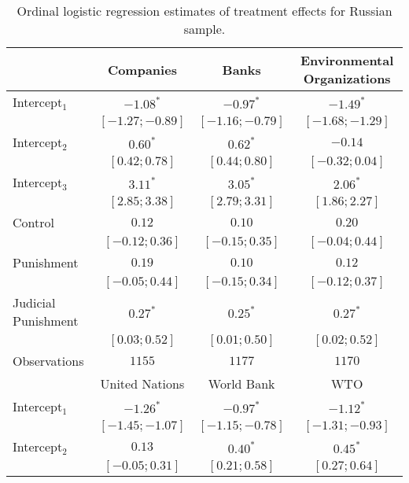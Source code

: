 \begin{table}[h]
\begin{center}
\caption{Ordinal logistic regression estimates of treatment effects for Russian sample.}
\begin{threeparttable}
\begin{tabular}{l c c c}
\hline
 & Companies & Banks & Environmental
Organizations \\
\hline
Intercept$_1$       & $-1.08^{*}$       & $-0.97^{*}$       & $-1.49^{*}$       \\
                    & $ [-1.27; -0.89]$ & $ [-1.16; -0.79]$ & $ [-1.68; -1.29]$ \\
Intercept$_2$       & $0.60^{*}$        & $0.62^{*}$        & $-0.14$           \\
                    & $ [ 0.42;  0.78]$ & $ [ 0.44;  0.80]$ & $ [-0.32;  0.04]$ \\
Intercept$_3$       & $3.11^{*}$        & $3.05^{*}$        & $2.06^{*}$        \\
                    & $ [ 2.85;  3.38]$ & $ [ 2.79;  3.31]$ & $ [ 1.86;  2.27]$ \\
Control             & $0.12$            & $0.10$            & $0.20$            \\
                    & $ [-0.12;  0.36]$ & $ [-0.15;  0.35]$ & $ [-0.04;  0.44]$ \\
Punishment          & $0.19$            & $0.10$            & $0.12$            \\
                    & $ [-0.05;  0.44]$ & $ [-0.15;  0.34]$ & $ [-0.12;  0.37]$ \\
Judicial Punishment & $0.27^{*}$        & $0.25^{*}$        & $0.27^{*}$        \\
                    & $ [ 0.03;  0.52]$ & $ [ 0.01;  0.50]$ & $ [ 0.02;  0.52]$ \\
\hline
Observations        & $1155$            & $1177$            & $1170$            \\
\hline
 & United Nations & World Bank & WTO \\
\hline
Intercept$_1$       & $-1.26^{*}$       & $-0.97^{*}$       & $-1.12^{*}$       \\
                    & $ [-1.45; -1.07]$ & $ [-1.15; -0.78]$ & $ [-1.31; -0.93]$ \\
Intercept$_2$       & $0.13$            & $0.40^{*}$        & $0.45^{*}$        \\
                    & $ [-0.05;  0.31]$ & $ [ 0.21;  0.58]$ & $ [ 0.27;  0.64]$ \\

\end{tabular}
\end{threeparttable}
\end{center}
\end{table}
